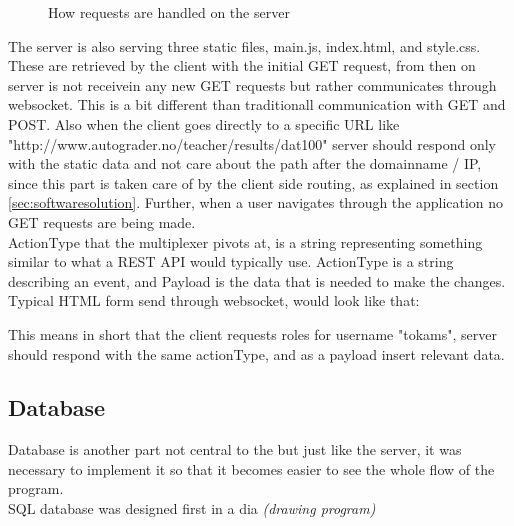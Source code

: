 \begin{figure}[h]
  
  \caption{How requests are handled on the server}
  \label{fig:serverwebsocket}
\end{figure}

The server is also serving three static files, main.js, index.html, and style.css. These are retrieved by the client with the initial GET request, from then on server is not receivein any new GET requests but rather communicates through websocket. This is a bit different than traditionall communication with GET and POST. Also when the client goes directly to a specific URL like "http://www.autograder.no/teacher/results/dat100" server should respond only with the static data and not care about the path after the domainname / IP, since this part is taken care of by the client side routing, as explained in section \ref{sec:softwaresolution}. Further, when a user navigates through the application no GET requests are being made.
\\ActionType that the multiplexer pivots at, is a string representing something similar to what a REST API would typically use. ActionType is a string describing an event, and Payload is the data that is needed to make the changes. Typical HTML form send through websocket, would look like that:



This means in short that the client requests roles for username "tokams", server should respond with the same actionType, and as a payload insert relevant data.

\subsection {Database}
Database is another part not central to the  but just like the server, it was necessary to implement it so that it becomes easier to see the whole flow of the program.
\\SQL database was designed first in a dia \emph{(drawing program)} 

